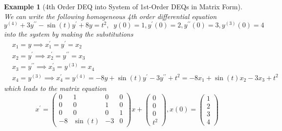 \documentclass{article}
\newtheorem{example}{Example}[section]
\theoremstyle{remark}
\theoremstyle{definition}
\begin{document}
      \begin{example}[4th Order DEQ into System of 1st-Order DEQs in Matrix Form]
      We can write the following homogeneous 4th order differential equation 
      \[y^{(4)} + 3 y^{\prime\prime} - \sin{(t)} y^\prime + 8y = t^2, \;\; y(0) = 1, y^\prime (0) = 2, y^{\prime\prime} (0) = 3, y^{(3)} (0) = 4 \]
      into the system by making the substitutions 
      \begin{align*}
          & x_1 = y \implies x_1^\prime = y^\prime = x_2 \\
          & x_2 = y^\prime \implies x_2^\prime = y^{\prime\prime} = x_3 \\
          & x_3 = y^{\prime\prime} \implies x_3^\prime = y^{(3)} = x_4 \\
          & x_4 = y^{(3)} \implies x_4^\prime = y^{(4)} = -8y + \sin{(t)} y^\prime - 3y^{\prime\prime} + t^2 = -8x_1 + \sin{(t)} x_2 - 3x_3 + t^2
      \end{align*}
      which leads to the matrix equation
      \[x^\prime =  \begin{pmatrix} 
      0&1&0&0\\
      0&0&1&0\\
      0&0&0&1\\
      -8&\sin(t)&-3&0
      \end{pmatrix} x
      + \begin{pmatrix} 
      0\\0\\0\\t^2
      \end{pmatrix}, x (0) = \begin{pmatrix} 
      1\\2\\3\\4
      \end{pmatrix}\]
      \end{example}
\end{document}
